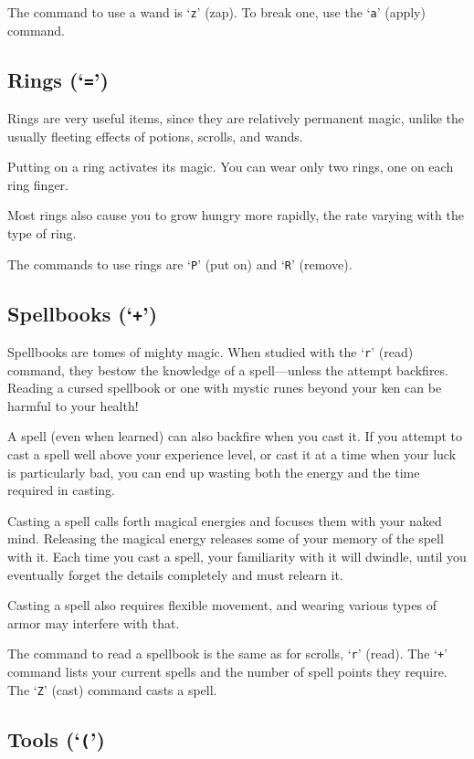 The command to use a wand is `{\tt z}' (zap).  To break one, use the `{\tt a}'
(apply) command.

\subsection*{Rings (`{\tt =}')}

Rings are very useful items, since they are relatively permanent
magic, unlike the usually fleeting effects of potions, scrolls, and
wands.

Putting on a ring activates its magic.  You can wear only two
rings, one on each ring finger.

Most rings also cause you to grow hungry more rapidly, the rate
varying with the type of ring.

The commands to use rings are `{\tt P}' (put on) and `{\tt R}' (remove).

\subsection*{Spellbooks (`{\tt +}')}

Spellbooks are tomes of mighty magic.  When studied with the `{\tt r}' (read)
command, they bestow the knowledge of a spell---unless the attempt
backfires.
Reading a cursed spellbook or one with mystic runes beyond
your ken can be harmful to your health!

A spell (even when learned) can also backfire when you cast it.  If you
attempt to cast a spell well above your experience level, or cast it at
a time when your luck is particularly bad, you can end up wasting both the
energy and the time required in casting.

Casting a spell calls forth magical energies and focuses them with
your naked mind.  Releasing the magical energy releases some of your
memory of the spell with it.  Each time you cast a spell, your
familiarity with it will dwindle, until you eventually forget the
details completely and must relearn it.

Casting a spell also requires flexible movement, and wearing various types
of armor may interfere with that.

The command to read a spellbook is the same as for scrolls, `{\tt r}'
(read).  The `{\tt +}' command lists your current spells and the number of
spell points they require.  The `{\tt Z}' (cast) command casts a spell.

\subsection*{Tools (`{\tt (}')}

